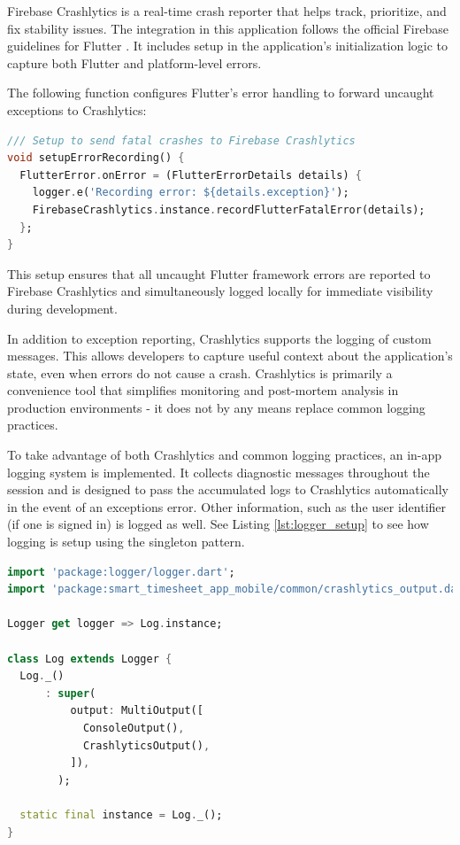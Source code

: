 \documentclass[
  digital,     %
  oneside,     %
  nosansbold,  %
  nocolorbold, %
  lof,         %
  lot,         %
]{fithesis4}
\begin{document}
Firebase Crashlytics is a real-time crash reporter that helps track, prioritize, and fix stability issues. The integration in this application follows the official Firebase guidelines for Flutter \cite{firebaseCrashlyticsStart}. It includes setup in the application’s initialization logic to capture both Flutter and platform-level errors.

The following function configures Flutter’s error handling to forward uncaught exceptions to Crashlytics:

\begin{lstlisting}[language=Dart, caption={Firebase Crashlytics configuration side of the app}, label={lst:error_recording}, floatplacement=H, showstringspaces=false]
/// Setup to send fatal crashes to Firebase Crashlytics
void setupErrorRecording() {
  FlutterError.onError = (FlutterErrorDetails details) {
    logger.e('Recording error: ${details.exception}');
    FirebaseCrashlytics.instance.recordFlutterFatalError(details);
  };
}
\end{lstlisting}

This setup ensures that all uncaught Flutter framework errors are reported to Firebase Crashlytics and simultaneously logged locally for immediate visibility during development.

In addition to exception reporting, Crashlytics supports the logging of custom messages. This allows developers to capture useful context about the application’s state, even when errors do not cause a crash. Crashlytics is primarily a convenience tool that simplifies monitoring and post-mortem analysis in production environments - it does not by any means replace common logging practices.

To take advantage of both Crashlytics and common logging practices, an in-app logging system is implemented. It collects diagnostic messages throughout the session and is designed to pass the accumulated logs to Crashlytics automatically in the event of an exceptions error. Other information, such as the user identifier (if one is signed in) is logged as well. See Listing \ref{lst:logger_setup} to see how logging is setup using the singleton pattern.

\begin{lstlisting}[language=Dart, caption={Logger setup with custom Crashlytics output}, label={lst:logger_setup}, floatplacement=H, showstringspaces=false]
import 'package:logger/logger.dart';
import 'package:smart_timesheet_app_mobile/common/crashlytics_output.dart';

Logger get logger => Log.instance;

class Log extends Logger {
  Log._()
      : super(
          output: MultiOutput([
            ConsoleOutput(),
            CrashlyticsOutput(),
          ]),
        );

  static final instance = Log._();
}
\end{lstlisting}
\end{document}
